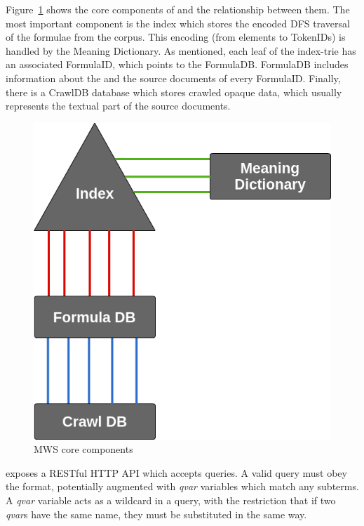 Figure~\ref{fig:simple_index} shows the core components of \MWS and the
relationship between them. The most important component is the index which
stores the encoded DFS traversal of the formulae from the corpus. This encoding
(from \cmml elements to \textsf{TokenID}s) is handled by the Meaning
Dictionary. As mentioned, each leaf of the index-trie has an associated
\textsf{FormulaID}, which points to the \textsf{FormulaDB}. \textsf{FormulaDB}
includes information about the \xpath and the source documents of every
\textsf{FormulaID}. Finally, there is a \textsf{CrawlDB} database which stores
crawled opaque data, which usually represents the textual part of the source
documents.

\begin{figure}[ht]\centering
    \includegraphics[scale=0.3]{img/simple_index.png}
    \caption{MWS core components}\label{fig:simple_index}
\end{figure}
\FloatBarrier

\mws exposes a RESTful HTTP API which accepts \xml queries.
A valid query must obey the \cmml format, potentially augmented with
\emph{qvar} variables which match any subterms.  A \emph{qvar} variable acts as
a wildcard in a query, with the restriction that if two \emph{qvar}s have the
same name, they must be substituted in the same way.

